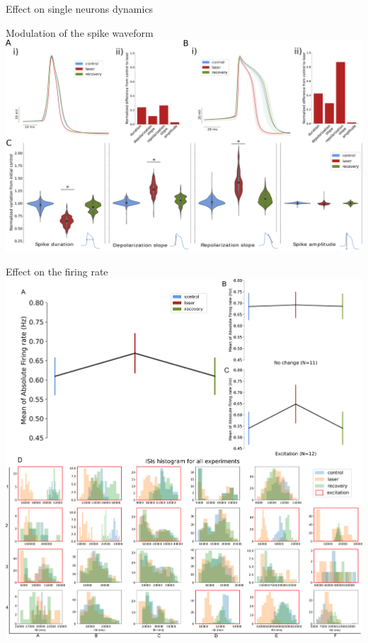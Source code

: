 \documentclass[aspectratio=43]{beamer}
\begin{document}
\begin{frame}{Effect on single neurons dynamics}
\end{frame}


\begin{frame}{Modulation of the spike waveform}
	\includegraphics[width=\textwidth]{laser/Figure2.png}
\end{frame}

\begin{frame}{Effect on the firing rate}
	\includegraphics[width=\textwidth]{laser/frequency.pdf}
\end{frame}
\end{document}
